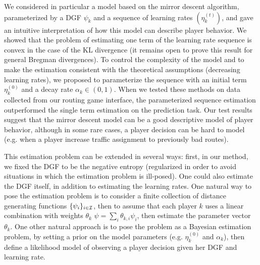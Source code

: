 \documentclass{sig-alternate-ipsn13}
\begin{document}
We considered in particular a model based on the mirror descent algorithm, parameterized by a DGF $\psi_k$ and a sequence of learning rates $(\eta^{(t)}_k)$, and gave an intuitive interpretation of how this model can describe player behavior. We showed that the problem of estimating one term of the learning rate sequence is convex in the case of the KL divergence (it remains open to prove this result for general Bregman divergences). To control the complexity of the model and to make the estimation consistent with the theoretical assumptions (decreasing learning rates), we proposed to parameterize the sequence with an initial term $\eta_k^{(0)}$ and a decay rate $\alpha_k \in (0, 1)$. When we tested these methods on data collected from our routing game interface, the parameterized sequence estimation outperformed the single term estimation on the prediction task. Our test results suggest that the mirror descent model can be a good descriptive model of player behavior, although in some rare cases, a player decision can be hard to model (e.g. when a player increase traffic assignment to previously bad routes).

This estimation problem can be extended in several ways: first, in our method, we fixed the DGF to be the negative entropy (regularized in order to avoid situations in which the estimation problem is ill-posed). One could also estimate the DGF itself, in addition to estimating the learning rates. One natural way to pose the estimation problem is to consider a finite collection of distance generating functions $\{\psi_i\}_{i \in \mathcal{I}}$, then to assume that each player $k$ uses a linear combination with weights $\theta_k$ $\psi = \sum_{i} \theta_{k, i} \psi_i$, then estimate the parameter vector $\theta_k$. One other natural approach is to pose the problem as a Bayesian estimation problem, by setting a prior on the model parameters (e.g. $\eta^{(0)}_k$ and $\alpha_k$), then define a likelihood model of observing a player decision given her DGF and learning rate.

%
\newpage

%
%

\end{document}
